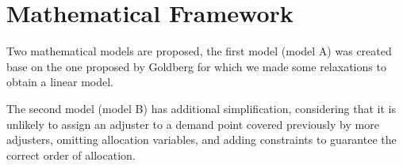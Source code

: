 \section{Mathematical Framework}

Two mathematical models are proposed,
the first model (model A) was created
base on the one proposed by Goldberg \cite{goldberg1990validating}
for which
we made some relaxations
to obtain a linear model.

The second model (model B)
has additional simplification,
considering that
it is unlikely
to assign an adjuster
to a demand point
covered previously
by more adjusters,
omitting allocation variables,
and adding constraints
to guarantee
the correct order of allocation.
